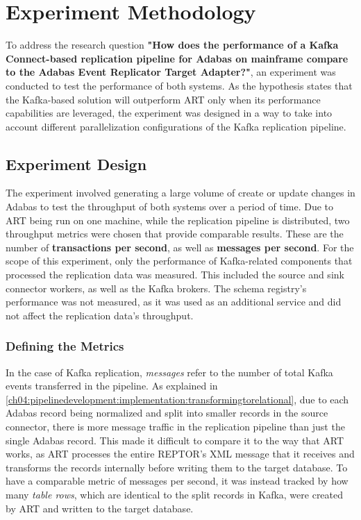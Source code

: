 \chapter{Experiment Methodology}
\label{ch05:methodology}
To address the research question \textbf{"How does the performance of a Kafka Connect-based replication pipeline for Adabas on mainframe compare to the Adabas Event Replicator Target Adapter?"}, an experiment was conducted to test the performance of both systems. As the hypothesis states that the Kafka-based solution will outperform \ac{ART} only when its performance capabilities are leveraged, the experiment was designed in a way to take into account different parallelization configurations of the Kafka replication pipeline.

\section{Experiment Design}
\label{ch05:methodology:design}
The experiment involved generating a large volume of create or update changes in Adabas to test the throughput of both systems over a period of time. Due to \ac{ART} being run on one machine, while the replication pipeline is distributed, two throughput metrics were chosen that provide comparable results. These are the number of \textbf{transactions per second}, as well as \textbf{messages per second}. For the scope of this experiment, only the performance of Kafka-related components that processed the replication data was measured. This included the source and sink connector workers, as well as the Kafka brokers. The schema registry's performance was not measured, as it was used as an additional service and did not affect the replication data's throughput.

\subsection{Defining the Metrics}
In the case of Kafka replication, \textit{messages} refer to the number of total Kafka events transferred in the pipeline. As explained in \ref{ch04:pipelinedevelopment:implementation:transformingtorelational}, due to each Adabas record being normalized and split into smaller records in the source connector, there is more message traffic in the replication pipeline than just the single Adabas record. This made it difficult to compare it to the way that \ac{ART} works, as \ac{ART} processes the entire \ac{REPTOR}'s XML message that it receives and transforms the records internally before writing them to the target database. To have a comparable metric of messages per second, it was instead tracked by how many \textit{table rows}, which are identical to the split records in Kafka, were created by \ac{ART} and written to the target database.


